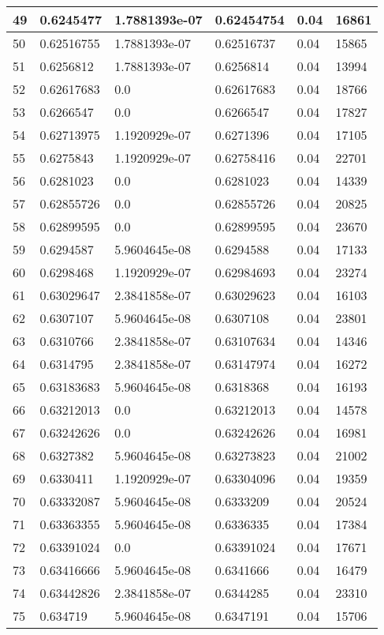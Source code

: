 \begin{longtable}{|l|l|l|l|l|l|}
49 & 0.6245477 & 1.7881393e-07 & 0.62454754 & 0.04 & 16861 \\ \hline 
50 & 0.62516755 & 1.7881393e-07 & 0.62516737 & 0.04 & 15865 \\ \hline 
51 & 0.6256812 & 1.7881393e-07 & 0.6256814 & 0.04 & 13994 \\ \hline 
52 & 0.62617683 & 0.0 & 0.62617683 & 0.04 & 18766 \\ \hline 
53 & 0.6266547 & 0.0 & 0.6266547 & 0.04 & 17827 \\ \hline 
54 & 0.62713975 & 1.1920929e-07 & 0.6271396 & 0.04 & 17105 \\ \hline 
55 & 0.6275843 & 1.1920929e-07 & 0.62758416 & 0.04 & 22701 \\ \hline 
56 & 0.6281023 & 0.0 & 0.6281023 & 0.04 & 14339 \\ \hline 
57 & 0.62855726 & 0.0 & 0.62855726 & 0.04 & 20825 \\ \hline 
58 & 0.62899595 & 0.0 & 0.62899595 & 0.04 & 23670 \\ \hline 
59 & 0.6294587 & 5.9604645e-08 & 0.6294588 & 0.04 & 17133 \\ \hline 
60 & 0.6298468 & 1.1920929e-07 & 0.62984693 & 0.04 & 23274 \\ \hline 
61 & 0.63029647 & 2.3841858e-07 & 0.63029623 & 0.04 & 16103 \\ \hline 
62 & 0.6307107 & 5.9604645e-08 & 0.6307108 & 0.04 & 23801 \\ \hline 
63 & 0.6310766 & 2.3841858e-07 & 0.63107634 & 0.04 & 14346 \\ \hline 
64 & 0.6314795 & 2.3841858e-07 & 0.63147974 & 0.04 & 16272 \\ \hline 
65 & 0.63183683 & 5.9604645e-08 & 0.6318368 & 0.04 & 16193 \\ \hline 
66 & 0.63212013 & 0.0 & 0.63212013 & 0.04 & 14578 \\ \hline 
67 & 0.63242626 & 0.0 & 0.63242626 & 0.04 & 16981 \\ \hline 
68 & 0.6327382 & 5.9604645e-08 & 0.63273823 & 0.04 & 21002 \\ \hline 
69 & 0.6330411 & 1.1920929e-07 & 0.63304096 & 0.04 & 19359 \\ \hline 
70 & 0.63332087 & 5.9604645e-08 & 0.6333209 & 0.04 & 20524 \\ \hline 
71 & 0.63363355 & 5.9604645e-08 & 0.6336335 & 0.04 & 17384 \\ \hline 
72 & 0.63391024 & 0.0 & 0.63391024 & 0.04 & 17671 \\ \hline 
73 & 0.63416666 & 5.9604645e-08 & 0.6341666 & 0.04 & 16479 \\ \hline 
74 & 0.63442826 & 2.3841858e-07 & 0.6344285 & 0.04 & 23310 \\ \hline 
75 & 0.634719 & 5.9604645e-08 & 0.6347191 & 0.04 & 15706 \\ \hline 
\end{longtable}